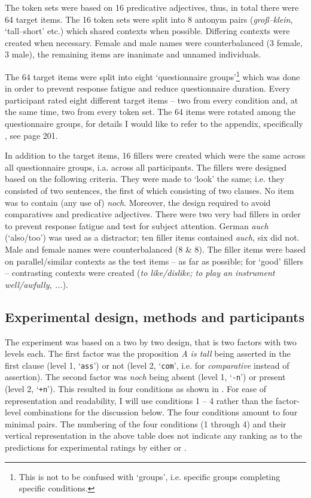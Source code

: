 \documentclass[output=paper
,modfonts
,nonflat]{langsci/langscibook}
\begin{document}
The token sets were based on 16 predicative adjectives, thus, in total there were 64 target items. The 16 token sets were split into 8 antonym pairs (\textit{groß--klein}, `tall--short' etc.) which shared contexts when possible. Differing contexts were created when necessary. Female and male names were counterbalanced (3 female, 3 male), the remaining items are inanimate and unnamed individuals.

The 64 target items were split into eight `questionnaire groups'\footnote{ This is not to be confused with `groups', i.e. specific groups completing specific conditions.} which was done in order to prevent response fatigue and reduce questionnaire duration. Every participant rated eight different target items -- two from every condition and, at the same time, two from every token set. The 64 items were rotated among the questionnaire groups, for details I would like to refer to the appendix, specifically , see page 201.

In addition to the target items, 16 fillers were created which were the same across all questionnaire groups, i.a. across all participants. The fillers were designed based on the following criteria. They were made to `look' the same; i.e. they consisted of two sentences, the first of which consisting of two clauses. No item was to contain (any use of) \textit{noch}. Moreover, the design required to avoid comparatives and predicative adjectives. There were two very bad fillers in order to prevent response fatigue and test for subject attention. German \textit{auch} (`also/too') was used as a distractor; ten filler items contained \textit{auch}, six did not. Male and female names were counterbalanced (8 \& 8). The filler items were based on parallel/similar contexts as the test items -- as far as possible; for `good' fillers -- contrasting contexts were created (\textit{to like/dislike; to play an instrument well/awfully, ...}).


\subsection{Experimental design, methods and participants}\label{experimental_design_and_methods}

The experiment was based on a two by two design, that is two factors with two levels each. The first factor was the proposition \textit{A is tall} being asserted in the first clause (level 1, `\texttt{ass}') or not (level 2, `\texttt{com}', i.e. for \textit{comparative} instead of assertion). The second factor was \textit{noch} being absent (level 1, `\texttt{-n}') or present (level 2, `\texttt{+n}'). This resulted in four conditions as shown in . For ease of representation and readability, I will use conditions 1 -- 4 rather than the factor-level combinations for the discussion below. The four conditions amount to four minimal pairs. The numbering of the four conditions (1 through 4) and their vertical representation in the above table does not indicate any ranking as to the predictions for experimental ratings by either \citeauthor{umbach2009a_comp} or \citeauthor{Hofstetter2013}. 
\end{document}
